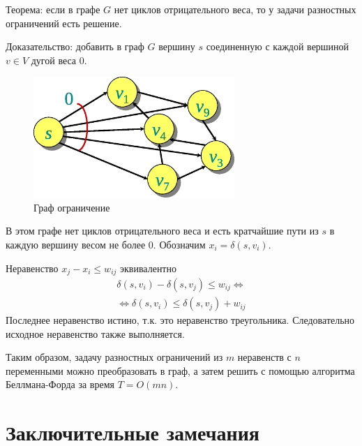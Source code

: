 \documentclass[11pt]{article}
\begin{document}
Теорема: если в графе $G$ нет циклов отрицательного веса, то у задачи разностных ограничений есть решение.

Доказательство: добавить в граф $G$ вершину $s$ соединенную с каждой вершиной $v \in V$ дугой веса $0$.
\begin{figure}[h!]
  \centering
  \includegraphics[width=3in]{lecture18/graph1.eps}
  \caption{Граф ограничение}
\end{figure}
В этом графе нет циклов отрицательного веса и есть кратчайшие пути из $s$ в каждую вершину весом не более $0$. Обозначим $x_i = \delta(s, v_i)$.

Неравенство $x_j - x_i \leqslant w_{i j}$ эквивалентно
\begin{align*}
   \delta(s, v_i) - \delta(s, v_j) \leqslant w_{i j} \iff \\
   \iff \delta(s, v_i) \leqslant \delta(s, v_j) + w_{i j}
\end{align*}
Последнее неравенство истино, т.к. это неравенство треугольника. Следовательно исходное неравенство также выполняется.

Таким образом, задачу разностных ограничений из $m$ неравенств с $n$ переменными можно преобразовать в граф, а затем решить с помощью алгоритма Беллмана-Форда за время $T = O(m n)$.

\section{Заключительные замечания}
\end{document}
